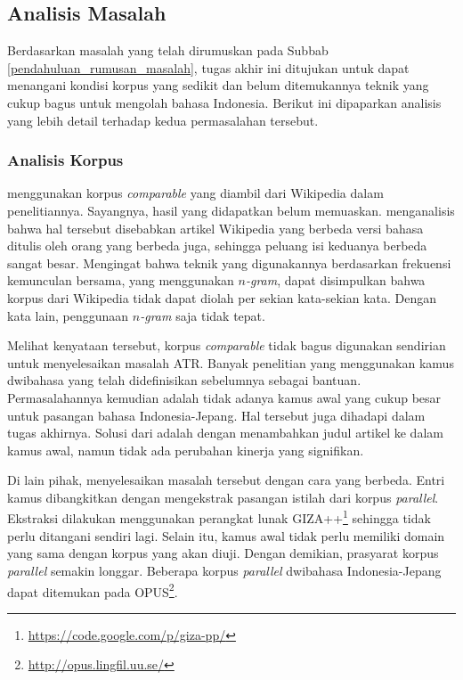 \documentclass[../main/main.tex]{subfiles}
\begin{document}

\subsection{Analisis Masalah}
\label{solusi_masalah}
Berdasarkan masalah yang telah dirumuskan pada Subbab \ref{pendahuluan_rumusan_masalah}, tugas akhir ini ditujukan untuk dapat menangani kondisi korpus yang sedikit dan belum ditemukannya teknik yang cukup bagus untuk mengolah bahasa Indonesia. Berikut ini dipaparkan analisis yang lebih detail terhadap kedua permasalahan tersebut.

\subsubsection{Analisis Korpus}
\label{solusi_korpus}
\textcite{limanthie} menggunakan korpus \textit{comparable} yang diambil dari Wikipedia dalam penelitiannya. Sayangnya, hasil yang didapatkan belum memuaskan. \textcite{limanthie} menganalisis bahwa hal tersebut disebabkan artikel Wikipedia yang berbeda versi bahasa ditulis oleh orang yang berbeda juga, sehingga peluang isi keduanya berbeda sangat besar. Mengingat bahwa teknik yang digunakannya berdasarkan frekuensi kemunculan bersama, yang menggunakan \textit{$n$-gram}, dapat disimpulkan bahwa korpus dari Wikipedia tidak dapat diolah per sekian kata-sekian kata. Dengan kata lain, penggunaan \textit{$n$-gram} saja tidak tepat.

Melihat kenyataan tersebut, korpus \textit{comparable} tidak bagus digunakan sendirian untuk menyelesaikan masalah ATR. Banyak penelitian yang menggunakan kamus dwibahasa yang telah didefinisikan sebelumnya sebagai bantuan. Permasalahannya kemudian adalah tidak adanya kamus awal yang cukup besar untuk pasangan bahasa Indonesia-Jepang. Hal tersebut juga dihadapi \textcite{limanthie} dalam tugas akhirnya. Solusi dari \textcite{limanthie} adalah dengan menambahkan judul artikel ke dalam kamus awal, namun tidak ada perubahan kinerja yang signifikan.

Di lain pihak, \textcite{aker} menyelesaikan masalah tersebut dengan cara yang berbeda. Entri kamus dibangkitkan dengan mengekstrak pasangan istilah dari korpus \textit{parallel}. Ekstraksi dilakukan menggunakan perangkat lunak GIZA++\footnote{\url{https://code.google.com/p/giza-pp/}} sehingga tidak perlu ditangani sendiri lagi. Selain itu, kamus awal tidak perlu memiliki domain yang sama dengan korpus yang akan diuji. Dengan demikian, prasyarat korpus \textit{parallel} semakin longgar. Beberapa korpus \textit{parallel} dwibahasa Indonesia-Jepang dapat ditemukan pada OPUS\footnote{\url{http://opus.lingfil.uu.se/}}.
\end{document}
